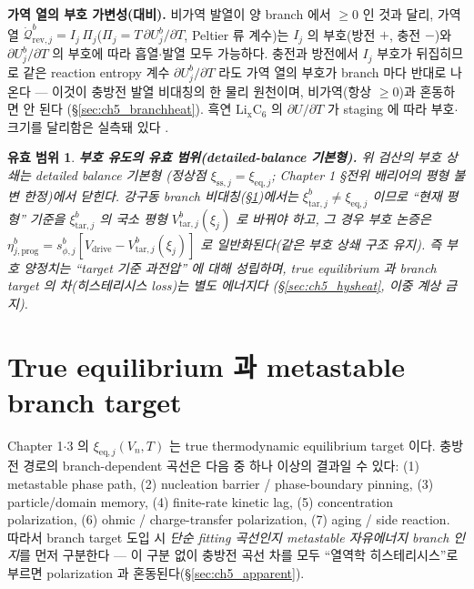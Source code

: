 \documentclass[11pt,a4paper]{article}
\newtheorem*{boundbox}{유효 범위}
\newcommand{\eq}{\mathrm{eq}}
\newcommand{\drive}{\mathrm{drive}}
\newcommand{\sstat}{\mathrm{ss}}
\newcommand{\rev}{\mathrm{rev}}
\newcommand{\tar}{\mathrm{tar}}
\newcommand{\prog}{\mathrm{prog}}
\begin{document}
\textbf{가역 열의 부호 가변성(대비).} 비가역 발열이 양 branch 에서 $\ge0$ 인 것과 달리, 가역 열
$\dot{\mathcal Q}_{\rev,j}^b=I_j\,\Pi_j$($\Pi_j=T\,\partial U_j^b/\partial T$, Peltier 류 계수)는 $I_j$ 의
부호(방전 $+$, 충전 $-$)와 $\partial U_j^b/\partial T$ 의 부호에 따라 흡열$\cdot$발열 모두 가능하다. 충전과 방전에서
$I_j$ 부호가 뒤집히므로 같은 reaction entropy 계수 $\partial U_j^b/\partial T$ 라도 가역 열의 부호가 branch 마다
반대로 나온다 — 이것이 충방전 발열 비대칭의 한 물리 원천이며, 비가역(항상 $\ge0$)과 혼동하면 안 된다
(\S\ref{sec:ch5_branchheat}). 흑연 $\mathrm{Li_xC_6}$ 의 $\partial U/\partial T$ 가 staging 에 따라 부호$\cdot$크기를
달리함은 실측돼 있다 \cite{reynier2004}.

\begin{boundbox}
\textbf{부호 유도의 유효 범위(detailed-balance 기본형).} 위 검산의 부호 상쇄는 detailed balance 기본형
(정상점 $\xi_{\sstat,j}=\xi_{\eq,j}$; Chapter 1 \S 전위 배리어의 평형 불변 한정)에서 닫힌다. 강구동 branch
비대칭(\S\ref{sec:ch5_branch})에서는 $\xi_{\tar,j}^b\ne\xi_{\eq,j}$ 이므로 ``현재 평형'' 기준을 $\xi_{\tar,j}^b$
의 국소 평형 $V_{\tar,j}^b(\xi_j)$ 로 바꿔야 하고, 그 경우 부호 논증은 $\eta_{j,\prog}^b=s_{\phi,j}^b
[V_\drive-V_{\tar,j}^b(\xi_j)]$ 로 일반화된다(같은 부호 상쇄 구조 유지). 즉 부호 양정치는 ``target 기준 과전압''
에 대해 성립하며, true equilibrium 과 branch target 의 차(히스테리시스 loss)는 별도 에너지다
(\S\ref{sec:ch5_hysheat}, 이중 계상 금지).
\end{boundbox}

\section{True equilibrium 과 metastable branch target}\label{sec:ch5_branch}
Chapter 1$\cdot$3 의 $\xi_{\eq,j}(V_n,T)$ 는 true thermodynamic equilibrium target 이다. 충방전 경로의
branch-dependent 곡선은 다음 중 하나 이상의 결과일 수 있다: (1) metastable phase path, (2) nucleation barrier /
phase-boundary pinning, (3) particle/domain memory, (4) finite-rate kinetic lag, (5) concentration polarization,
(6) ohmic / charge-transfer polarization, (7) aging / side reaction. 따라서 branch target 도입 시 \emph{단순
fitting 곡선인지 metastable 자유에너지 branch 인지}를 먼저 구분한다 — 이 구분 없이 충방전 곡선 차를 모두
``열역학 히스테리시스''로 부르면 polarization 과 혼동된다(\S\ref{sec:ch5_apparent}).
\end{document}
